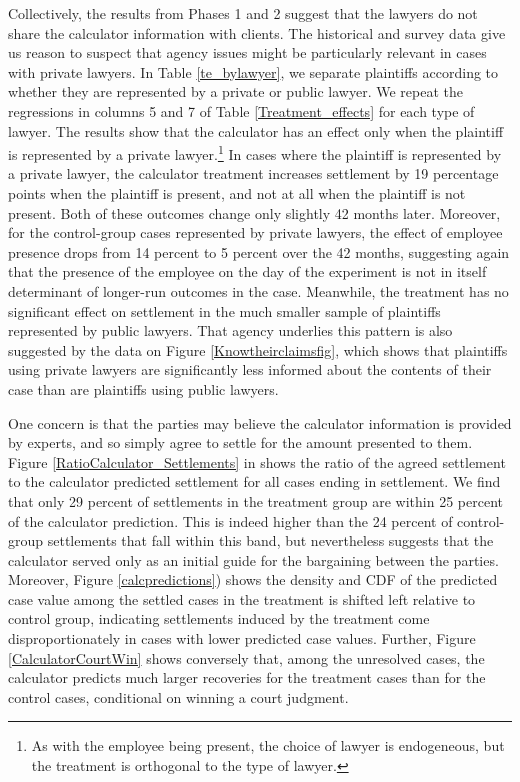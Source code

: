 \documentclass[11pt, a4paper]{article}
\begin{document}
 Collectively, the results from Phases 1 and 2 suggest that the lawyers do not share the calculator information with clients. The historical and survey data give us reason to suspect that agency issues might be particularly relevant in cases with private lawyers. In Table \ref{te_bylawyer}, we separate plaintiffs according to whether they are represented by a private or public lawyer. We repeat the regressions in columns 5 and 7 of Table \ref{Treatment_effects} for each type of lawyer. The results show that the calculator has an effect only when the plaintiff is represented by a private lawyer.\footnote{As with the employee being present, the choice of lawyer is endogeneous, but the treatment is orthogonal to the type of lawyer.} In cases where the plaintiff is represented by a private lawyer, the calculator treatment increases settlement by 19 percentage points when the plaintiff is present, and not at all when the plaintiff is not present. Both of these outcomes change only slightly 42 months later. Moreover, for the control-group cases represented by private lawyers, the effect of employee presence drops from 14 percent to 5 percent over the 42 months, suggesting again that the presence of the employee on the day of the experiment is not in itself determinant of longer-run outcomes in the case. Meanwhile, the treatment has no significant effect on settlement in the much smaller sample of plaintiffs represented by public lawyers. That agency underlies this pattern is also suggested by the data on Figure \ref{Knowtheirclaimsfig}, which shows that plaintiffs using private lawyers are significantly less informed about the contents of their case than are plaintiffs using public lawyers.

One concern is that the parties may believe the calculator information is provided by experts, and so simply agree to settle for the amount presented to them. Figure \ref{RatioCalculator_Settlements} in  shows the ratio of the agreed settlement to the calculator predicted settlement for all cases ending in settlement. We find that only 29 percent of settlements in the treatment group are within 25 percent of the calculator prediction. This is indeed higher than the 24 percent of control-group settlements that fall within this band, but nevertheless suggests that the calculator served only as an initial guide for the bargaining between the parties. Moreover, Figure \ref{calcpredictions}) shows the density and CDF of the predicted case value among the settled cases in the treatment is shifted left relative to control group, indicating settlements induced by the treatment come disproportionately in cases with lower predicted case values.  Further, Figure \ref{CalculatorCourtWin} shows conversely that, among the unresolved cases, the calculator predicts much larger recoveries for the treatment cases than for the control cases, conditional on winning a court judgment. 
\end{document}
